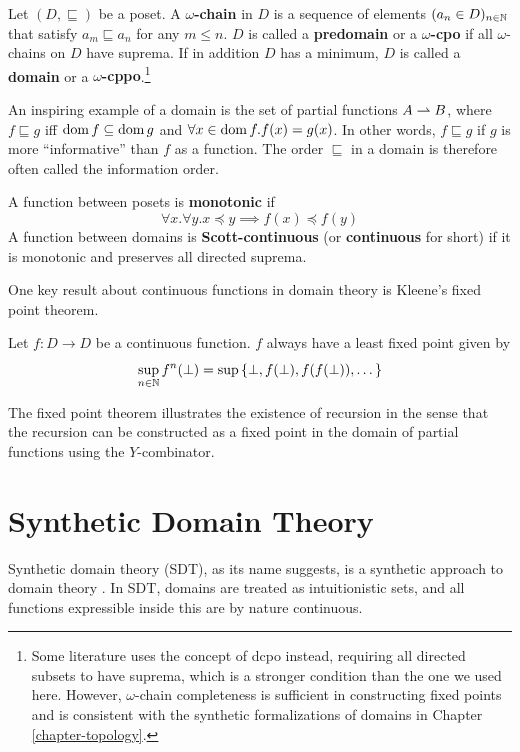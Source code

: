 \begin{definition}
    Let $(D,\sqsubseteq)$ be a poset. A \textbf{$\omega$-chain} in $D$ is a sequence of elements $(a_n\in D)_{n\in\mathbb{N}}$ that satisfy $a_m\sqsubseteq a_n$ for any $m\le n$. $D$ is called a \textbf{predomain} or a \textbf{$\omega$-cpo} if all $\omega$-chains on $D$ have suprema. If in addition $D$ has a minimum, $D$ is called a \textbf{domain} or a \textbf{$\omega$-cppo}.\footnote{Some literature uses the concept of dcpo instead, requiring all directed subsets to have suprema, which is a stronger condition than the one we used here. However, $\omega$-chain completeness is sufficient in constructing fixed points and is consistent with the synthetic formalizations of domains in Chapter \ref{chapter-topology}.}
\end{definition}

An inspiring example of a domain is the set of partial functions $A\rightharpoonup B$, where $f\sqsubseteq g$ iff $\operatorname{dom} f\subseteq\operatorname{dom} g$ and $\forall x\in\operatorname{dom} f.f(x)=g(x)$. In other words, $f\sqsubseteq g$ if $g$ is more ``informative'' than $f$ as a function. The order $\sqsubseteq$ in a domain is therefore often called the information order.

\begin{definition}
    A function between posets is \textbf{monotonic} if
    $$\forall x.\forall y.x\preceq y\implies f(x)\preceq f(y)$$
    A function between domains is \textbf{Scott-continuous} (or \textbf{continuous} for short) if it is monotonic and preserves all directed suprema.
\end{definition}

One key result about continuous functions in domain theory is Kleene's fixed point theorem.
\begin{theorem}
    Let $f:D\to D$ be a continuous function. $f$ always have a least fixed point given by
    $$\sup_{n\in\mathbb{N}}f^n(\bot)=\sup\left\{\bot,f(\bot),f(f(\bot)),\dots\right\}$$
\end{theorem}
The fixed point theorem illustrates the existence of recursion in the sense that the recursion can be constructed as a fixed point in the domain of partial functions using the $Y$-combinator.

\section{Synthetic Domain Theory}

Synthetic domain theory (SDT), as its name suggests, is a synthetic approach to domain theory \cite{hyland_first_1991,reus_general_1997,reus_program_1996}. In SDT, domains are treated as intuitionistic sets, and all functions expressible inside this are by nature continuous.

